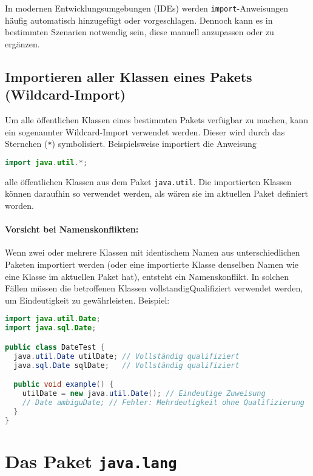 In modernen Entwicklungsumgebungen (IDEs) werden \texttt{import}-Anweisungen häufig automatisch hinzugefügt oder vorgeschlagen. 
Dennoch kann es in bestimmten Szenarien notwendig sein, diese manuell anzupassen oder zu ergänzen.

\subsection{Importieren aller Klassen eines Pakets (Wildcard-Import)}
\label{ssec:wildcard_import}

Um alle öffentlichen Klassen eines bestimmten Pakets verfügbar zu machen, kann ein sogenannter Wildcard-Import verwendet werden. 
Dieser wird durch das Sternchen (\texttt{*}) symbolisiert. Beispielsweise importiert die Anweisung
\begin{lstlisting}[language=Java, caption={Wildcard-Import des java.util Pakets}]
import java.util.*;
\end{lstlisting}
alle öffentlichen Klassen aus dem Paket \texttt{java.util}. Die importierten Klassen können daraufhin so verwendet werden, 
als wären sie im aktuellen Paket definiert worden.

\paragraph{Vorsicht bei Namenskonflikten:}
Wenn zwei oder mehrere Klassen mit identischem Namen aus unterschiedlichen Paketen importiert werden 
(oder eine importierte Klasse denselben Namen wie eine Klasse im aktuellen Paket hat), entsteht ein Namenskonflikt. 
In solchen Fällen müssen die betroffenen Klassen \gls{vollstandigQualifiziert} verwendet werden, um Eindeutigkeit zu gewährleisten.
Beispiel:
\begin{lstlisting}[language=Java, caption={Umgang mit Namenskonflikten}]
import java.util.Date;
import java.sql.Date;

public class DateTest {
  java.util.Date utilDate; // Vollständig qualifiziert
  java.sql.Date sqlDate;   // Vollständig qualifiziert

  public void example() {
    utilDate = new java.util.Date(); // Eindeutige Zuweisung
    // Date ambiguDate; // Fehler: Mehrdeutigkeit ohne Qualifizierung
  }
}
\end{lstlisting}


\section{Das Paket \texttt{java.lang}}
\label{sec:java_lang}


